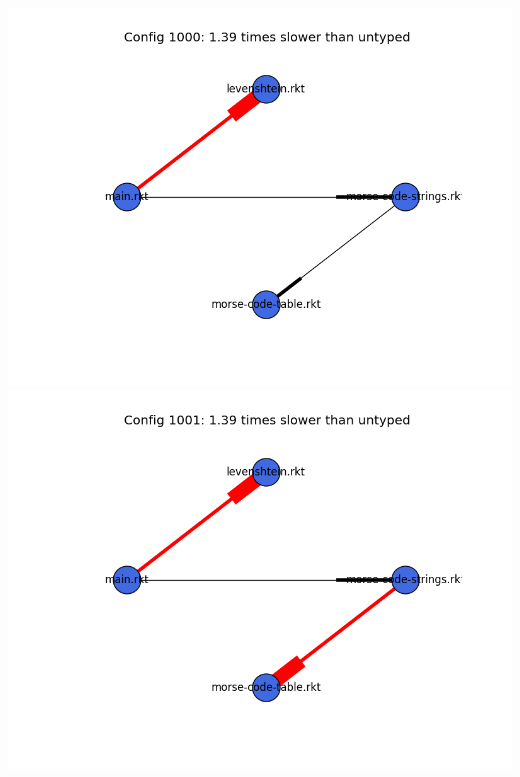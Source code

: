 \documentclass{article}
\begin{document}
\begin{itemize}
\includegraphics[width=\textwidth]{morse-code-module-graph-1000.png}
\includegraphics[width=\textwidth]{morse-code-module-graph-1001.png}
\end{itemize}
\end{document}
